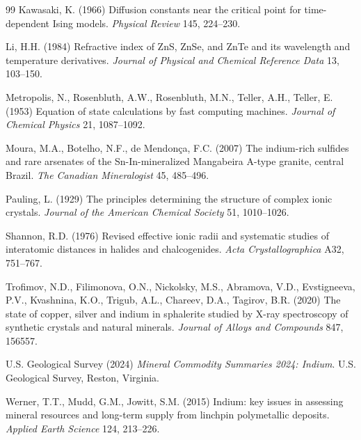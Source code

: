 \documentclass[11pt,a4paper]{article}
\begin{document}
\begin{thebibliography}{99}
Kawasaki, K. (1966) Diffusion constants near the critical point for
time-dependent Ising models. \textit{Physical Review} 145, 224--230.

Li, H.H. (1984) Refractive index of ZnS, ZnSe, and ZnTe and its wavelength and
temperature derivatives. \textit{Journal of Physical and Chemical Reference
Data} 13, 103--150.

Metropolis, N., Rosenbluth, A.W., Rosenbluth, M.N., Teller, A.H., Teller, E.
(1953) Equation of state calculations by fast computing machines.
\textit{Journal of Chemical Physics} 21, 1087--1092.

Moura, M.A., Botelho, N.F., de Mendon\c{c}a, F.C. (2007) The indium-rich
sulfides and rare arsenates of the Sn-In-mineralized Mangabeira A-type granite,
central Brazil. \textit{The Canadian Mineralogist} 45, 485--496.

Pauling, L. (1929) The principles determining the structure of complex ionic
crystals. \textit{Journal of the American Chemical Society} 51, 1010--1026.

Shannon, R.D. (1976) Revised effective ionic radii and systematic studies of
interatomic distances in halides and chalcogenides. \textit{Acta
Crystallographica} A32, 751--767.

Trofimov, N.D., Filimonova, O.N., Nickolsky, M.S., Abramova, V.D., Evstigneeva,
P.V., Kvashnina, K.O., Trigub, A.L., Chareev, D.A., Tagirov, B.R. (2020) The
state of copper, silver and indium in sphalerite studied by X-ray spectroscopy
of synthetic crystals and natural minerals. \textit{Journal of Alloys and
Compounds} 847, 156557.

U.S. Geological Survey (2024) \textit{Mineral Commodity Summaries 2024:
Indium}. U.S. Geological Survey, Reston, Virginia.

Werner, T.T., Mudd, G.M., Jowitt, S.M. (2015) Indium: key issues in assessing
mineral resources and long-term supply from linchpin polymetallic deposits.
\textit{Applied Earth Science} 124, 213--226.

\end{thebibliography}
\end{document}
